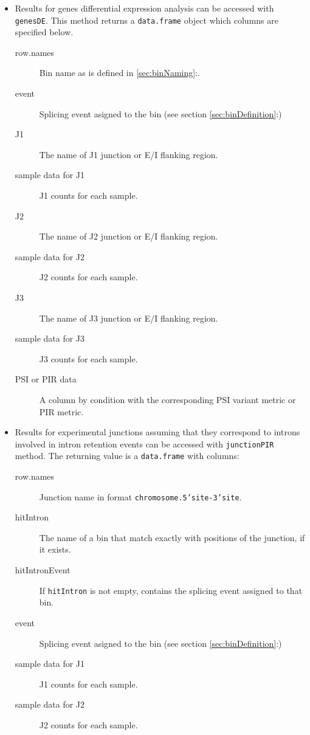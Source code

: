 \documentclass{article}
\newcommand{\secref}[1]{\ref{#1}:\nameref{#1}}
\begin{document}
\begin{itemize}
  \item Results for genes differential expression analysis can be accessed with
  \texttt{genesDE}. This method returns a \texttt{data.frame}
  object which columns are specified below.
    \begin{description}
      \item[row.names] Bin name as is defined in \secref{sec:binNaming}.
      \item[event] Splicing event asigned to the bin (see section
      \ref{sec:binDefinition}:)
      \item[J1] The name of J1 junction or E/I flanking region.
      \item[sample data for J1] J1 counts for each sample.
      \item[J2] The name of J2 junction or E/I flanking region.
      \item[sample data for J2] J2 counts for each sample.
      \item[J3] The name of J3 junction or E/I flanking region.
      \item[sample data for J3] J3 counts for each sample.
      \item[PSI or PIR data] A column by condition with the corresponding PSI
      variant metric or PIR metric.
      \\
    \end{description}
  \item Results for experimental junctions assuming that they correspond to
  introns involved in intron retention events can be accessed with
  \texttt{junctionPIR} method. The returning value is a \texttt{data.frame} with
  columns:
    \begin{description}
      \item[row.names] Junction name in format \texttt{chromosome.5'site-3'site}.
      \item[hitIntron] The name of a bin that match exactly with positions of
      the junction, if it exists.
      \item[hitIntronEvent] If \texttt{hitIntron} is not empty, contains the
      splicing event assigned to that bin.
      \item[event] Splicing event asigned to the bin (see section
      \ref{sec:binDefinition}:)
      \item[sample data for J1] J1 counts for each sample.
      \item[sample data for J2] J2 counts for each sample.

\end{description}
\end{itemize}
\end{document}
